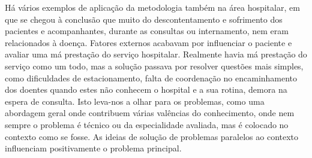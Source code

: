 \documentclass[twoside,twocolumn]{article}
\begin{document}
\newline \indent Há vários exemplos de aplicação da metodologia também na área hospitalar, em que se chegou à conclusão que muito do descontentamento e sofrimento dos pacientes e acompanhantes, durante as consultas ou internamento, nem eram relacionados à doença. Fatores externos acabavam por influenciar o paciente e avaliar uma má prestação do serviço hospitalar. Realmente havia má prestação do serviço como um todo, mas a solução passava por resolver questões mais simples, como dificuldades de estacionamento, falta de coordenação no encaminhamento dos doentes quando estes não conhecem o hospital e a sua rotina, demora na espera de consulta.\citep{TimeMJV2017} Isto leva-nos a olhar para os problemas, como uma abordagem geral onde contribuem várias valências do conhecimento, onde nem sempre o problema é técnico ou da especialidade avaliada, mas é colocado no contexto como se fosse. As ideias de solução de problemas paralelos ao contexto influenciam positivamente o problema principal.



 

 
\end{document}
